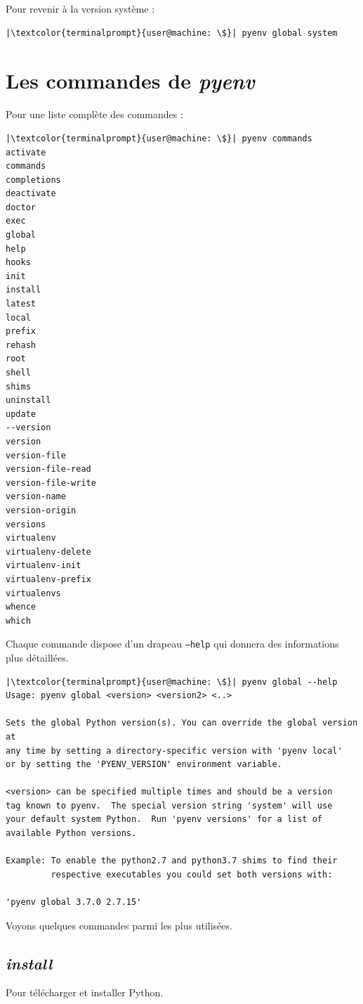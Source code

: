 Pour revenir à la version système :
\begin{lstlisting}[style=terminal]
|\textcolor{terminalprompt}{user@machine: \$}| pyenv global system
\end{lstlisting}

\section{Les commandes de \textit{pyenv}}
Pour une liste complète des commandes :
\begin{lstlisting}[style=terminal]
|\textcolor{terminalprompt}{user@machine: \$}| pyenv commands
activate
commands
completions
deactivate
doctor
exec
global
help
hooks
init
install
latest
local
prefix
rehash
root
shell
shims
uninstall
update
--version
version
version-file
version-file-read
version-file-write
version-name
version-origin
versions
virtualenv
virtualenv-delete
virtualenv-init
virtualenv-prefix
virtualenvs
whence
which
\end{lstlisting}

Chaque commande dispose d'un drapeau \texttt{--help} qui donnera des informations plus détaillées.
\begin{lstlisting}[style=terminal]
|\textcolor{terminalprompt}{user@machine: \$}| pyenv global --help
Usage: pyenv global <version> <version2> <..>

Sets the global Python version(s). You can override the global version at
any time by setting a directory-specific version with 'pyenv local'
or by setting the 'PYENV_VERSION' environment variable.

<version> can be specified multiple times and should be a version
tag known to pyenv.  The special version string 'system' will use
your default system Python.  Run 'pyenv versions' for a list of
available Python versions.

Example: To enable the python2.7 and python3.7 shims to find their
         respective executables you could set both versions with:

'pyenv global 3.7.0 2.7.15'
\end{lstlisting}

Voyons quelques commandes parmi les plus utilisées.

\subsection*{\textit{install}}
Pour télécharger et installer Python.

